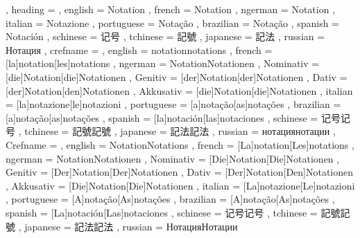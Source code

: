   {
    , heading =   {
                    , english     = Notation
                    , french      = Notation
                    , ngerman     = Notation
                    , italian     = Notazione
                    , portuguese  = Notação
                    , brazilian   = Notação
                    , spanish     = Notación
                    , schinese    = 记号
                    , tchinese    = 記號
                    , japanese    = 記法
                    , russian     = Нотация
                  }
    , crefname =  {
                    , english     = {notation}{notations}
                    , french      = [la]{notation}[les]{notations}
                    , ngerman     = { {Notation}{Notationen}
                                      , Nominativ = [die]{Notation}[die]{Notationen}
                                      , Genitiv   = [der]{Notation}[der]{Notationen}
                                      , Dativ     = [der]{Notation}[den]{Notationen}
                                      , Akkusativ = [die]{Notation}[die]{Notationen}
                                    }
                    , italian     = [la]{notazione}[le]{notazioni}
                    , portuguese  = [a]{notação}[as]{notações}
                    , brazilian   = [a]{notação}[as]{notações}
                    , spanish     = [la]{notación}[las]{notaciones}
                    , schinese    = {记号}{记号}
                    , tchinese    = {記號}{記號}
                    , japanese    = {記法}{記法}
                    , russian     = {нотация}{нотации}
                  }
    , Crefname =  {
                    , english     = {Notation}{Notations}
                    , french      = [La]{notation}[Les]{notations}
                    , ngerman     = { {Notation}{Notationen}
                                      , Nominativ = [Die]{Notation}[Die]{Notationen}
                                      , Genitiv   = [Der]{Notation}[Der]{Notationen}
                                      , Dativ     = [Der]{Notation}[Den]{Notationen}
                                      , Akkusativ = [Die]{Notation}[Die]{Notationen}
                                    }
                    , italian     = [La]{notazione}[Le]{notazioni}
                    , portuguese  = [A]{notação}[As]{notações}
                    , brazilian   = [A]{notação}[As]{notações}
                    , spanish     = [La]{notación}[Las]{notaciones}
                    , schinese    = {记号}{记号}
                    , tchinese    = {記號}{記號}
                    , japanese    = {記法}{記法}
                    , russian     = {Нотация}{Нотации}
                  }
  }

